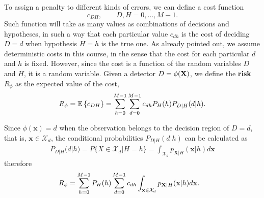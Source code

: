 To assign a penalty to different kinds of errors, we can define a cost function $$c_{DH}, \qquad D,H = 0, \ldots, M-1.$$ Such function will take as many values as combinations of decisions and hypotheses, in such a way that each particular value $c_{dh}$ is the cost of deciding $D=d$ when hypothesis $H=h$ is the true one. As already pointed out, we assume deterministic costs in this course, in the sense that the cost for each particular $d$ and $h$ is fixed. However, since the cost is a function of the random variables $D$ and $H$, it is a random variable. 
Given a detector $D = \phi({\bf X})$, we define the \textbf{risk} $R_\phi$ as the expected value of the cost,
\begin{align}
\label{eq:def_Drisk}
R_\phi = \mathbb{E}\left\{c_{DH}\right\} = \sum_{h=0}^{M-1} \sum_{d=0}^{M-1} c_{dh} P_H(h) P_{D|H}(d|h).
\end{align}

Since $\phi(\mathbf{x})=d$ when the observation belongs to the decision region of $D=d$, that is, $\mathbf{x} \in \mathcal{X}_d$, the conditional probabilities $P_{D|H}(d|h)$ can be calculated as
\begin{align}
\label{eq:PDgivenH}
P_{D|H}(d|h) = P\{X \in \mathcal{X}_d | H=h \}
             = \int_{\mathcal{X}_d} p_{\mathbf{X}|H}(\mathbf{x}|h) d\mathbf{x}
\end{align}
therefore
\begin{align}
R_\phi 
	& = \sum_{h=0}^{M-1} P_H(h) \sum_{d=0}^{M-1} c_{dh} 
	                     \int_{{\bf x}\in {\cal X}_d} p_{{\bf X}|H}({\bf x}|h) d{\bf x}.
\end{align}

